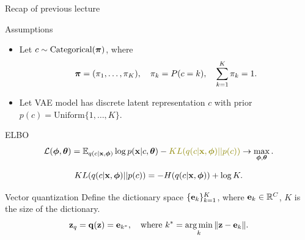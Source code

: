
\usepackage{tikz}

\usetikzlibrary{arrows,shapes,positioning,shadows,trees}

\begin{frame}
\titlepage
\end{frame}
\begin{frame}{Recap of previous lecture}
	\begin{block}{Assumptions}
		\begin{itemize}
			\item Let $c \sim \text{Categorical}(\boldsymbol{\pi})$, where 
			\vspace{-0.6cm}
			\[
			\boldsymbol{\pi} = (\pi_1, \dots, \pi_K), \quad \pi_k = P(c = k), \quad \sum_{k=1}^K \pi_k = 1.
			\]
			\vspace{-0.7cm}
			\item Let VAE model has discrete latent representation $c$ with prior $p(c) = \text{Uniform}\{1, \dots, K\}$.
		\end{itemize}
	\end{block}
	\begin{block}{ELBO}
		\vspace{-0.6cm}
		\[
			\mathcal{L} (\bphi, \btheta)  = \mathbb{E}_{q(c | \bx, \bphi)} \log p(\bx | c, \btheta) - {\color{olive} KL(q(c| \bx, \bphi) || p(c))} \rightarrow \max_{\bphi, \btheta}.
		\]
	\end{block}
	\vspace{-1.0cm}
	\[
		KL(q(c| \mathbf{x}, \boldsymbol{\phi}) || p(c)) = - H(q(c | \mathbf{x}, \boldsymbol{\phi})) + \log K. 
	\]		
	\vspace{-0.5cm}
	\begin{block}{Vector quantization}
		Define the dictionary space $\{\mathbf{e}_k\}_{k=1}^K$, where $\mathbf{e}_k \in \mathbb{R}^C$, $K$ is the size of the dictionary.
		\vspace{-0.3cm}
		\[
		\mathbf{z}_q = \mathbf{q} (\mathbf{z}) = \mathbf{e}_{k^*}, \quad \text{where } k^* = \operatorname*{arg\,min}_k \| \mathbf{z} - \mathbf{e}_k \|.
		\] 
		\vspace{-0.7cm}
	\end{block}
\end{frame}
